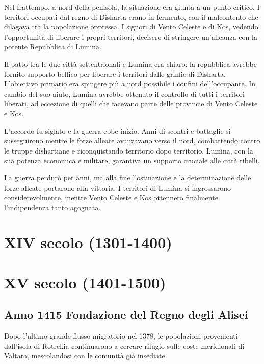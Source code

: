 Nel frattempo, a nord della penisola, la situazione era giunta a un
punto critico. I territori occupati dal regno di Disharta erano in
fermento, con il malcontento che dilagava tra la popolazione oppressa. I
signori di Vento Celeste e di Kos, vedendo l'opportunità di liberare i
propri territori, decisero di stringere un'alleanza con la potente
Repubblica di Lumina.

Il patto tra le due città settentrionali e Lumina era chiaro: la
repubblica avrebbe fornito supporto bellico per liberare i territori
dalle grinfie di Disharta. L'obiettivo primario era spingere più a nord
possibile i confini dell'occupante. In cambio del suo aiuto, Lumina
avrebbe ottenuto il controllo di tutti i territori liberati, ad
eccezione di quelli che facevano parte delle provincie di Vento Celeste
e Kos.

L'accordo fu siglato e la guerra ebbe inizio. Anni di scontri e
battaglie si susseguirono mentre le forze alleate avanzavano verso il
nord, combattendo contro le truppe dishartiane e riconquistando
territorio dopo territorio. Lumina, con la sua potenza economica e
militare, garantiva un supporto cruciale alle città ribelli.

La guerra perdurò per anni, ma alla fine l'ostinazione e la
determinazione delle forze alleate portarono alla vittoria. I territori
di Lumina si ingrossarono considerevolmente, mentre Vento Celeste e Kos
ottennero finalmente l'indipendenza tanto agognata.

\section{XIV secolo (1301-1400)}\label{xiv-secolo-1301-1400}

\section{XV secolo (1401-1500)}\label{xv-secolo-1401-1500}

\subsection{Anno 1415 Fondazione del Regno degli
Alisei}\label{anno-1415-fondazione-del-regno-degli-alisei}

Dopo l'ultimo grande flusso migratorio nel 1378, le popolazioni
provenienti dall'isola di Rotrekia continuarono a cercare rifugio sulle
coste meridionali di Valtara, mescolandosi con le comunità già
insediate.

